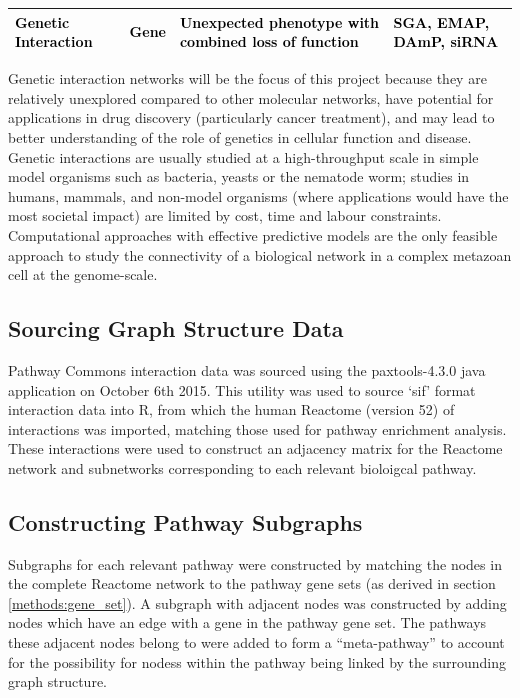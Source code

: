 \begin{flushleft}
\begin{supertabular}{m{4.0490003cm}|m{2.55cm}|m{4.301cm}|m{4.201cm}}
\bfseries\color{black}
{\fontsize{10pt}{12.0pt}\selectfont \textcolor{black}{Genetic
Interaction}} &
\color{black}
{\fontsize{10pt}{12.0pt}\selectfont \textcolor{black}{Gene}} &
\color{black}
{\fontsize{10pt}{12.0pt}\selectfont \textcolor{black}{Unexpected
phenotype with combined loss of function}} &
\color{black}
{\fontsize{10pt}{12.0pt}\selectfont \textcolor{black}{SGA, EMAP, DAmP,
siRNA}}\\\hline
\end{supertabular}
\end{flushleft}

Genetic interaction networks will be the focus of this project because they are relatively unexplored compared to other molecular networks, have potential for applications in drug discovery (particularly cancer treatment), and may lead to better understanding of the role of genetics in cellular function and disease. Genetic interactions are usually studied at a high-throughput scale in simple model organisms such as bacteria, yeasts or the nematode worm; studies in humans, mammals, and non-model organisms (where applications would have the most societal impact) are limited by cost, time and labour constraints. Computational approaches with effective predictive models are the only feasible approach to study the connectivity of a biological network in a complex metazoan cell at the genome-scale.

\fi

\subsection{Sourcing Graph Structure Data}
Pathway Commons interaction data was sourced using the paxtools-4.3.0 java application on October 6th 2015. This utility was used to source `sif' format interaction data into R, from which the human Reactome (version 52) of interactions was imported, matching those used for pathway enrichment analysis. These interactions were used to construct an adjacency matrix for the Reactome network and subnetworks corresponding to each relevant bioloigcal pathway. 

\subsection{Constructing Pathway Subgraphs}
Subgraphs for each relevant pathway were constructed by matching the nodes in the complete Reactome network to the pathway gene sets (as derived in section \ref{methods:gene_set}). A subgraph with adjacent nodes was constructed by adding nodes which have an edge with a gene in the pathway gene set. The pathways these adjacent nodes belong to were added to form a ``meta-pathway'' to account for the possibility for nodess within the pathway being linked by the surrounding graph structure.

